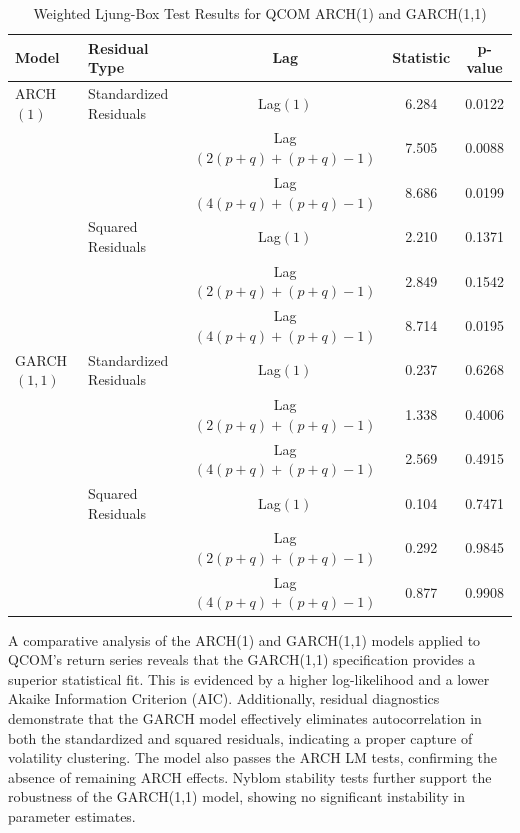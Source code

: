 \documentclass[12pt]{article}
\begin{document}
\begin{table}[h!]
	\centering
	\caption{Weighted Ljung-Box Test Results for QCOM ARCH(1) and GARCH(1,1)}
	\begin{tabular}{llccc}
		\hline
		\textbf{Model} & \textbf{Residual Type} & \textbf{Lag} & \textbf{Statistic} & \textbf{p-value} \\
		\hline
		ARCH$(1)$   & Standardized Residuals      & Lag$(1)$              & 6.284   & 0.0122 \\
		&                             & Lag$(2(p+q)+(p+q)-1)$ & 7.505   & 0.0088 \\
		&                             & Lag$(4(p+q)+(p+q)-1) $& 8.686   & 0.0199 \\
		& Squared Residuals           & Lag$(1)$              & 2.210   & 0.1371 \\
		&                             & Lag$(2(p+q)+(p+q)-1)$ & 2.849   & 0.1542 \\
		&                             & Lag$(4(p+q)+(p+q)-1)$ & 8.714   & 0.0195 \\
		GARCH$(1,1)$ & Standardized Residuals     & Lag$(1)$              & 0.237   & 0.6268 \\
		&                            & Lag$(2(p+q)+(p+q)-1)$ & 1.338   & 0.4006 \\
		&                            & Lag$(4(p+q)+(p+q)-1)$ & 2.569   & 0.4915 \\
		& Squared Residuals          & Lag$(1)$              & 0.104   & 0.7471 \\
		&                            & Lag$(2(p+q)+(p+q)-1)$ & 0.292   & 0.9845 \\
		&                            & Lag$(4(p+q)+(p+q)-1)$ & 0.877   & 0.9908 \\
		\hline
	\end{tabular}
	\label{tab:qcom_combined_wlb}
\end{table}

A comparative analysis of the ARCH(1) and GARCH(1,1) models applied to QCOM’s return series reveals that the GARCH(1,1) specification provides a superior statistical fit. This is evidenced by a higher log-likelihood and a lower Akaike Information Criterion (AIC). Additionally, residual diagnostics demonstrate that the GARCH model effectively eliminates autocorrelation in both the standardized and squared residuals, indicating a proper capture of volatility clustering. The model also passes the ARCH LM tests, confirming the absence of remaining ARCH effects. Nyblom stability tests further support the robustness of the GARCH(1,1) model, showing no significant instability in parameter estimates.
\end{document}
